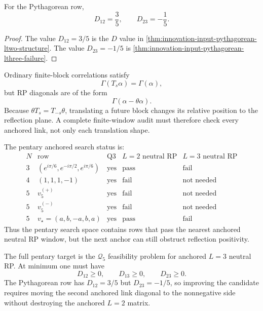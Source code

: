 \begin{theorem}
\label{thm:innovation-input-link-diagonal-anchor-dependence}
For the Pythagorean row,
$$
D_{12}=\frac35,
\qquad
D_{23}=-\frac15.
$$
\end{theorem}

\begin{proof}
The value $D_{12}=3/5$ is the $D$ value in
\autoref{thm:innovation-input-pythagorean-ltwo-structure}. The value
$D_{23}=-1/5$ is
\autoref{thm:innovation-input-pythagorean-lthree-failure}.
\end{proof}

\begin{principle}
\label{prin:innovation-input-anchor-sensitive-rp-audit}
Ordinary finite-block correlations satisfy
$$
\Gamma(T_s\alpha)=\Gamma(\alpha),
$$
but RP diagonals are of the form
$$
\Gamma(\alpha-\theta\alpha).
$$
Because $\theta T_s=T_{-s}\theta$, translating a future block changes its
relative position to the reflection plane. A complete finite-window audit
must therefore check every anchored link, not only each translation shape.
\end{principle}

\begin{principle}
\label{prin:innovation-input-pentary-anchored-status-table}
The pentary anchored search status is:
$$
\begin{array}{c|c|c|c|c}
N & \text{row} & \text{Q3} & L=2\text{ neutral RP} & L=3\text{ neutral RP}\\
\hline
3 & (e^{i\pi/6},e^{-i\pi/2},e^{i\pi/6}) &
\text{yes} & \text{pass} & \text{fail}\\
4 & (1,1,1,-1) &
\text{yes} & \text{fail} & \text{not needed}\\
5 & v_5^{(+)} &
\text{yes} & \text{fail} & \text{not needed}\\
5 & v_5^{(-)} &
\text{yes} & \text{fail} & \text{not needed}\\
5 & v_\star=(a,b,-a,b,a) &
\text{yes} & \text{pass} & \text{fail}
\end{array}
$$
Thus the pentary search space contains rows that pass the nearest anchored
neutral RP window, but the next anchor can still obstruct reflection
positivity.
\end{principle}

\begin{principle}[Pentary $L=3$ target]
\label{prin:innovation-input-pentary-lthree-target}
The full pentary target is the $\mathcal Q_5$ feasibility problem for
anchored $L=3$ neutral RP. At minimum one must have
$$
D_{12}\ge0,
\qquad
D_{13}\ge0,
\qquad
D_{23}\ge0.
$$
The Pythagorean row has $D_{12}=3/5$ but $D_{23}=-1/5$, so improving the
candidate requires moving the second anchored link diagonal to the
nonnegative side without destroying the anchored $L=2$ matrix.
\end{principle}


